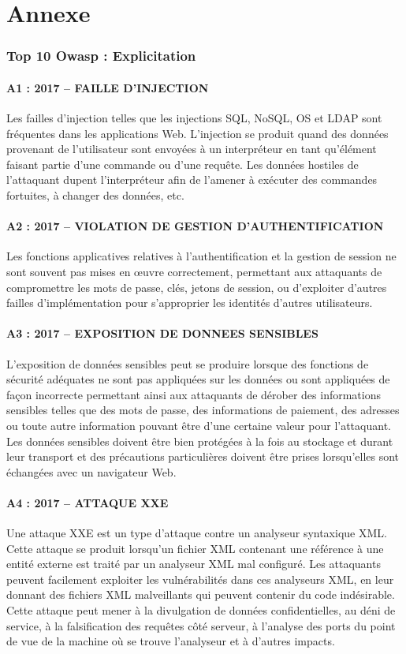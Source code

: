 \part*{Annexe}
%

\section*{Top 10 Owasp : Explicitation}
\subsection*{A1 : 2017 – FAILLE D’INJECTION}
Les failles d’injection telles que les injections SQL, NoSQL, OS et LDAP sont fréquentes dans les applications Web. L'injection se produit quand des données provenant de l'utilisateur sont envoyées à un interpréteur en tant qu'élément faisant partie d'une commande ou d'une requête. Les données hostiles de l'attaquant dupent l'interpréteur afin de l'amener à exécuter des commandes fortuites, à changer des données, etc.

\subsection*{A2 : 2017 – VIOLATION DE GESTION D’AUTHENTIFICATION}
Les fonctions applicatives relatives à l'authentification et la gestion de session ne sont souvent pas mises en œuvre correctement, permettant aux attaquants de compromettre les mots de passe, clés, jetons de session, ou d'exploiter d'autres failles d'implémentation pour s'approprier les identités d'autres utilisateurs.
\subsection*{A3 : 2017 – EXPOSITION DE DONNEES SENSIBLES}
L’exposition de données sensibles peut se produire lorsque des fonctions de sécurité adéquates ne sont pas appliquées sur les données ou sont appliquées de façon incorrecte permettant ainsi  aux attaquants de dérober des informations sensibles telles que des mots de passe, des informations de paiement, des adresses ou toute autre information pouvant être d’une certaine valeur pour l’attaquant. Les données sensibles doivent être bien protégées à la fois au stockage et durant leur transport et des précautions particulières doivent être prises lorsqu’elles sont échangées avec un navigateur Web.
\subsection*{A4 : 2017 – ATTAQUE XXE}
Une attaque XXE est un type d’attaque contre un analyseur syntaxique XML. Cette attaque se produit lorsqu’un fichier XML contenant une référence à une entité externe est traité par un analyseur XML mal configuré. Les attaquants peuvent facilement exploiter les vulnérabilités dans ces analyseurs XML, en leur donnant des fichiers XML malveillants qui peuvent contenir du code indésirable. Cette attaque peut mener à la divulgation de données confidentielles, au déni de service, à la falsification des requêtes côté serveur, à l'analyse des ports du point de vue de la machine où se trouve l'analyseur et à d'autres impacts.
